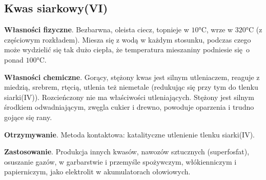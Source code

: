 \subsection{Kwas siarkowy(VI) }
\textbf{Własności fizyczne}.
Bezbarwna, oleista ciecz, topnieje w $10\si{\celsius}$, wrze w $320\si{\celsius}$ (z częściowym rozkładem).
Miesza się z wodą w każdym stosunku, podczas czego może wydzielić się tak dużo ciepła, że temperatura mieszaniny podniesie się o ponad $100\si{\celsius}$.

\textbf{Własności chemiczne}.
Gorący, stężony kwas jest silnym utleniaczem, reaguje z miedzią, srebrem, rtęcią, utlenia też niemetale (redukując się przy tym do tlenku siarki(IV)).
Rozcieńczony nie ma właściwości utleniających.
Stężony jest silnym środkiem odwadniającym, zwęgla cukier i drewno, powoduje oparzenia i trudno gojące się rany.

\textbf{Otrzymywanie}.
Metoda kontaktowa: katalityczne utlenienie tlenku siarki(IV).

\textbf{Zastosowanie}.
Produkcja innych kwasów, nawozów sztucznych (superfosfat), osuszanie gazów, w garbarstwie i przemyśle spożywczym, włókienniczym i papierniczym, jako elektrolit w akumulatorach ołowiowych.
